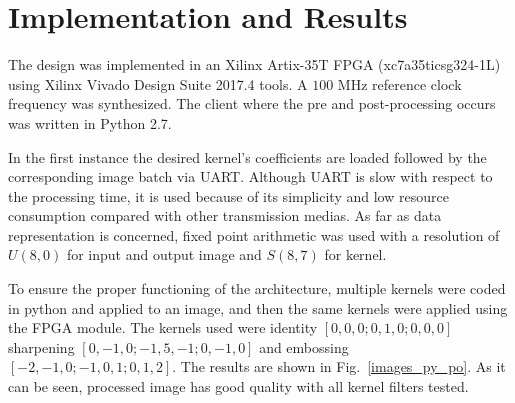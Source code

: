 \documentclass[conference,compsoc]{IEEEtran}
\begin{document}

\section{Implementation and Results}\label{sec:implementation}

The design was implemented in an Xilinx Artix-35T FPGA (xc7a35ticsg324-1L) using Xilinx
Vivado Design Suite 2017.4 tools. A $100$ MHz reference clock frequency was synthesized.
The client where the pre and post-processing occurs was written in Python 2.7.

In the first instance the desired kernel's coefficients are loaded followed by
the corresponding image batch via UART\@. Although UART is slow with respect to
the processing time, it is used because of its simplicity and low resource
consumption compared with other transmission medias.
As far as data representation is concerned, fixed point arithmetic was used with
a resolution of $U(8,0)$ for input and output image and $S(8,7)$ for kernel.

To ensure the proper functioning of the architecture, multiple kernels were
coded in python and applied to an image, and then the same kernels were applied using
the FPGA module. The kernels used were identity $[0, 0, 0; 0, 1, 0; 0, 0, 0]$
sharpening $[0, -1, 0; -1, 5, -1; 0, -1, 0]$ and embossing $[-2, -1, 0; -1, 0,
1; 0, 1, 2]$. The results are shown in Fig.~\ref{images_py_po}. As it can be seen, processed
image has good quality with all kernel filters tested.
\end{document}
